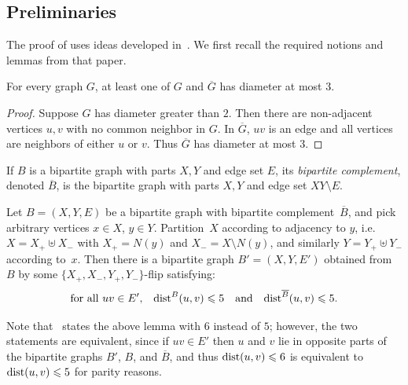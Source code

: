 \subsection{Preliminaries}


The proof of  uses ideas developed in~\cite{drabik2026variants}. We first recall the required notions and lemmas from that paper.


\begin{lemma}[folklore]\label{lem:diamComplement}
    For every graph $G$, at least one of $G$ and $\overline{G}$ has diameter at most $3$.
\end{lemma}
\begin{proof}
Suppose $G$ has diameter greater than $2$. Then there are non-adjacent vertices $u,v$ with no common neighbor in $G$.
In $\overline G$, $uv$ is an edge and all vertices are neighbors of either $u$ or $v$.
Thus $\overline G$ has diameter at most $3$.
\end{proof}

If $B$
is a bipartite graph with parts $X,Y$ and edge set $E$,
its \emph{bipartite complement}, denoted $\overline B$, 
is the bipartite graph with parts $X,Y$ and edge set $XY\setminus E$.


\begin{lemma}\label{lem:bipartite-informal-lemma}
  Let $B = (X,Y,E)$ be a bipartite graph with bipartite complement~$\overline{B}$, and pick arbitrary vertices $x \in X$, $y \in Y$.
  Partition~$X$ according to adjacency to $y$,
  i.e.\ $X = X_+ \uplus X_-$ with $X_+ = N(y)$ and $X_- = X \setminus N(y)$,
  and similarly $Y = Y_+ \uplus Y_-$ according to~$x$.
  Then there is a bipartite graph $B' = (X,Y,E')$ obtained from $B$ by some $\{X_+,X_-,Y_+,Y_-\}$-flip satisfying:
  \[ \text{for all $uv \in E'$,} \quad \mathrm{dist}^B(u,v) \leqslant 5 \quad \text{and} \quad \mathrm{dist}^{\overline{B}}(u,v) \leqslant 5. \]
\end{lemma}
Note that~\cite[Lemma~A.3]{drabik2026variants} states the above lemma with $6$ instead of $5$; however, the two statements are equivalent, since 
if $uv\in E'$ then $u$ and $v$ lie in opposite parts of the bipartite graphs $B'$, $B$, and $\overline{B}$, and thus $\mathrm{dist}(u,v)\leqslant 6$ is equivalent to $\mathrm{dist}(u,v)\leqslant 5$ for parity reasons.

